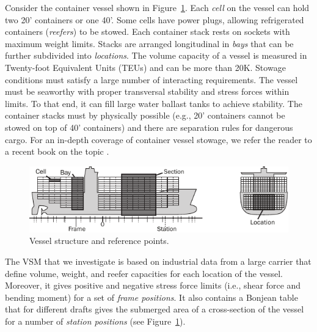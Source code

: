 \documentclass{llncs}
\begin{document}
Consider the container vessel shown in Figure~\ref{fig:vessel}. Each \emph{cell} on the vessel can hold two 20' containers or one 40'. Some cells have power plugs, allowing refrigerated containers (\emph{reefers}) to be stowed. Each container stack rests on sockets with maximum weight limits. Stacks are arranged longitudinal in \emph{bays} that can be further subdivided into \emph{locations}. The volume capacity of a vessel is measured in Twenty-foot Equivalent Units (TEUs) and can be more than 20K. Stowage conditions must satisfy a large number of interacting requirements. The vessel must be seaworthy with proper transversal stability and stress forces within limits. To that end, it can fill large water ballast tanks to achieve stability. The container stacks must by physically possible (e.g., 20' containers cannot be stowed on top of 40' containers) and there are separation rules for dangerous cargo. For an in-depth coverage of container vessel stowage, we refer the reader to a recent book on the topic \cite{JPAV18}.     

\begin{figure}[b!]
	\centering
		\includegraphics{figures/vessel4.pdf}
	\caption{Vessel structure and reference points.}
	\label{fig:vessel}
\end{figure}

The VSM that we investigate is based on industrial data from a large carrier that define volume, weight, and reefer capacities for each location of the vessel. Moreover, it gives positive and negative stress force limits (i.e., shear force and bending moment) for a set of \emph{frame positions}. It also contains a Bonjean table that for different drafts gives the submerged area of a cross-section of the vessel for a number of \emph{station positions} (see Figure~\ref{fig:vessel}). 
\end{document}
